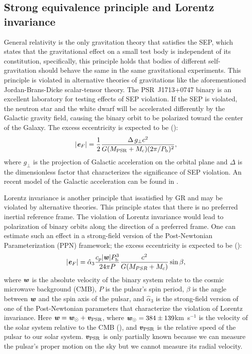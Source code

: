 \subsection{Strong equivalence principle and Lorentz invariance}
\label{sec:sep}
General relativity is the only gravitation theory that satisfies
the SEP, which states that the gravitational
effect on a small test body is independent of its constitution, specifically,
this principle holds that bodies of different self-gravitation should behave the same in
the same gravitational experiments. This principle is violated in alternative
theories of gravitations like the aforementioned Jordan-Brans-Dicke
scalar-tensor theory. The PSR~J1713+0747 binary is an excellent laboratory for testing 
effects of SEP violation. If the SEP is violated, the neutron star and the white
dwarf will be accelerated differently by the Galactic gravity field, causing
the binary orbit to be polarized toward the center of the Galaxy. The excess 
eccentricity is expected to be (\citealt{ds91}):
\begin{equation}
|\textbf{\textit{e}}_F| = \frac{1}{2}\frac{\Delta\, g_{\bot}
  c^2}{G(M_{\rm PSR}+M_{\rm
c})(2\pi/P_{\rm b})^2},
\end{equation}
where $g_{\bot}$ is the projection of Galactic acceleration on the orbital plane 
and $\Delta$ is the dimensionless factor that characterizes the significance 
of SEP violation. An recent model of the Galactic acceleration can be found in
\citealt{hf04a}.

Lorentz invariance is another principle that issatisfied by GR and may
be violated by alternative theories. This principle
states that there is no preferred inertial reference frame. The violation of
Lorentz invariance would lead to polarization of binary orbits along the
direction of a preferred frame.
One can estimate such an effect in a strong-field version of the Post-Newtonian Parameterization
(PPN) framework\cite{de92}; the excess eccentricity is expected to be (\citealt{bd96}):
\begin{equation}
|\textbf{\textit{e}}_F| = \hat{\alpha}_3 \frac{c_p|\textbf{\textit{w}}|P_{\rm b}^3}{24\pi P}
\frac{c^2}{G (M_{PSR}+M_{\rm c})}\sin \beta,
\end{equation}
where $\textbf{\textit{w}}$ is the absolute velocity of the binary system
relate to the cosmic microwave background (CMB), $P$ is the pulsar's spin period, $\beta$ is the
angle between $\textbf{\textit{w}}$ and the spin axis of the pulsar, and
$\hat{\alpha}_3$ is the strong-field version of one of the Post-Newtonian parameters that characterize the
violation of Lorentz invariance. 
Here $\textbf{\textit{w}} = \textbf{\textit{w}}_{\odot} + \textbf{\textit{v}}_{\rm PSR}$, where
$\textbf{\textit{w}}_{\odot}=384\pm139$km~s$^{-1}$ is the velocity of
the solar system relative to the CMB (\citealt{aaa+13}),
and $\textbf{\textit{v}}_{\rm PSR}$ is the relative speed of the pulsar to our solar system. $\textbf{\textit{v}}_{\rm PSR}$ is only partially known because we can measure the pulsar's
proper motion on the sky but we cannot measure its radial velocity.

